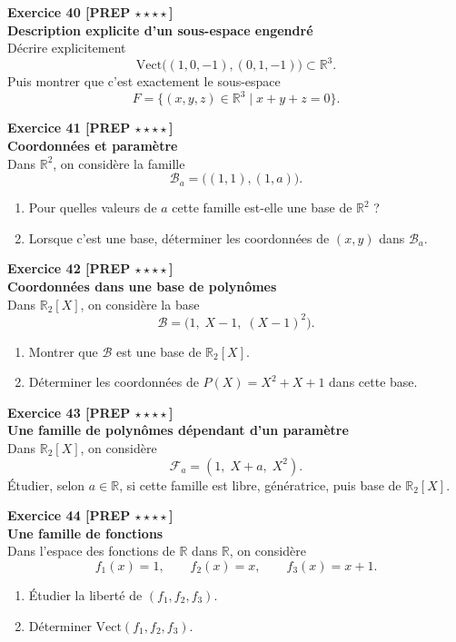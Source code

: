 \documentclass[11pt,a4paper]{article}
\begin{document}
\textbf{Exercice 40 [PREP $\star\star\star\star$]}\\
\textbf{Description explicite d’un sous-espace engendré}\\
Décrire explicitement
\[
\mathrm{Vect}\big((1,0,-1),(0,1,-1)\big)\subset\mathbb{R}^3.
\]
Puis montrer que c’est exactement le sous-espace
\[
F=\{(x,y,z)\in\mathbb{R}^3\mid x+y+z=0\}.
\]

\textbf{Exercice 41 [PREP $\star\star\star\star$]}\\
\textbf{Coordonnées et paramètre}\\
Dans \(\mathbb{R}^2\), on considère la famille
\[
\mathcal B_a=\big((1,1),(1,a)\big).
\]
\begin{enumerate}[label=\alph*)]
    \item Pour quelles valeurs de \(a\) cette famille est-elle une base de \(\mathbb{R}^2\) ?
    \item Lorsque c’est une base, déterminer les coordonnées de \((x,y)\) dans \(\mathcal B_a\).
\end{enumerate}

\textbf{Exercice 42 [PREP $\star\star\star\star$]}\\
\textbf{Coordonnées dans une base de polynômes}\\
Dans \(\mathbb{R}_2[X]\), on considère la base
\[
\mathcal B=\big(1,\;X-1,\;(X-1)^2\big).
\]
\begin{enumerate}[label=\alph*)]
    \item Montrer que \(\mathcal B\) est une base de \(\mathbb{R}_2[X]\).
    \item Déterminer les coordonnées de \(P(X)=X^2+X+1\) dans cette base.
\end{enumerate}

\textbf{Exercice 43 [PREP $\star\star\star\star$]}\\
\textbf{Une famille de polynômes dépendant d’un paramètre}\\
Dans \(\mathbb{R}_2[X]\), on considère
\[
\mathcal F_a=(1,\;X+a,\;X^2).
\]
Étudier, selon \(a\in\mathbb{R}\), si cette famille est libre, génératrice, puis base de \(\mathbb{R}_2[X]\).

\textbf{Exercice 44 [PREP $\star\star\star\star$]}\\
\textbf{Une famille de fonctions}\\
Dans l’espace des fonctions de \(\mathbb{R}\) dans \(\mathbb{R}\), on considère
\[
f_1(x)=1,\qquad f_2(x)=x,\qquad f_3(x)=x+1.
\]
\begin{enumerate}[label=\alph*)]
    \item Étudier la liberté de \((f_1,f_2,f_3)\).
    \item Déterminer \(\mathrm{Vect}(f_1,f_2,f_3)\).
\end{enumerate}
\end{document}
